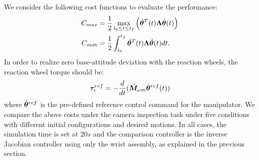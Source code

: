 We consider the following cost functions to evaluate the performance:
%
\begin{align}
  C_{max} &= \frac{1}{2}\max_{t_{0} \leq t \leq t_{f}}\Big({\dot{\bm{\theta}}}^{T}(t)\bm{\Lambda}{\dot{\bm{\theta}}}(t)\Big)
\label{eq:Tmax}\\
  C_{sum} &= \frac{1}{2}\int_{t_{0}}^{t_{f}}{\dot{\bm{\theta}}}^{T}(t)\bm{\Lambda}{\dot{\bm{\theta}}}(t)dt.
\label{eq:Tsum}
\end{align}
%
In order to realize zero base-attitude deviation with the reaction wheels,
the reaction wheel torque should be:
%
\begin{align}
  \bm{\tau}_{r}^{ref} = -\frac{d}{dt}({\tilde{\bm{M}}}_{\omega m}{\dot{\bm{\theta}}}^{ref}(t))
\end{align}
%
where ${\dot{\bm{\theta}}}^{ref}$ is the pre-defined reference control command for the manipulator.
We compare the above costs under the camera inspection task under five conditions
with different  initial configurations and desired motions.
In  all cases, the simulation time is set at $20\unit{s}$ and the comparison controller is
the inverse Jacobian controller using only the wrist assembly, as explained in the previous section.


